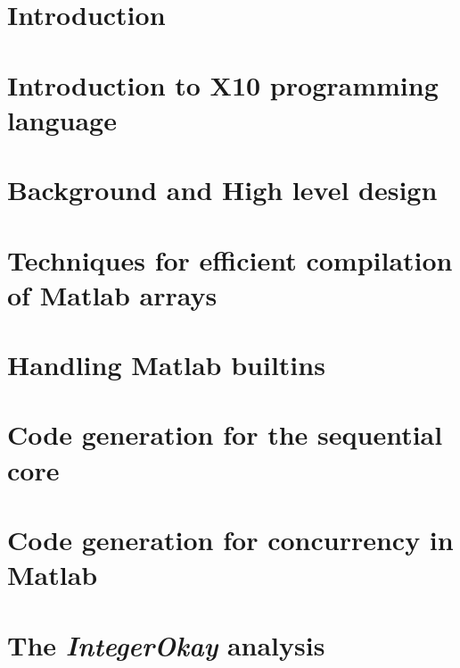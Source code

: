 \documentclass[MSc,twoside,openright]{Thesis}
\newcommand{\matlab}{{\sc Matlab}\xspace}
\newcommand{\xten}{{\sc X10}\xspace}
\begin{document}
\chapter{Introduction} \label{chap:Introduction}


\chapter{Introduction to \xten programming
language}\label{chap:Xten}



\chapter{Background and High level design} \label{chap:Design}


\chapter{Techniques for efficient compilation of \matlab arrays} 
\label{chap:Arrays}


\chapter{Handling \matlab builtins}
\label{chap:Builtins}


\chapter{Code generation for the sequential core} \label{chap:CodegenSeq}


\chapter{Code generation for concurrency in \matlab} \label{chap:CodegenCon}



\chapter{The \emph{IntegerOkay} analysis} 
\label{chap:Analyses}

\end{document}
